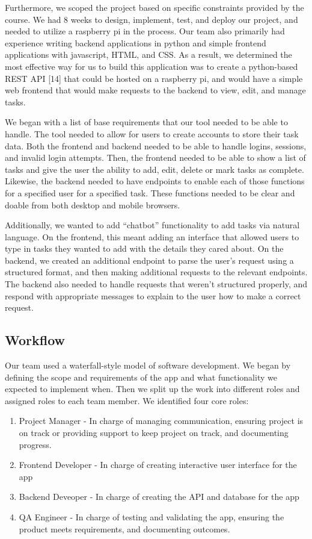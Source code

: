 \documentclass[11pt,oneside]{article}
\begin{document}
Furthermore, we scoped the project based on specific constraints provided by the course. We had 8 weeks to design, implement, test, and deploy our project, and needed to utilize a raspberry pi in the process. Our team also primarily had experience writing backend applications in python and simple frontend applications with javascript, HTML, and CSS. As a result, we determined the most effective way for us to build this application was to create a python-based REST API [14] that could be hosted on a raspberry pi, and would have a simple web frontend that would make requests to the backend to view, edit, and manage tasks.

We began with a list of base requirements that our tool needed to be able to handle. The tool needed to allow for users to create accounts to store their task data. Both the frontend and backend needed to be able to handle logins, sessions, and invalid login attempts. Then, the frontend needed to be able to show a list of tasks and give the user the ability to add, edit, delete or mark tasks as complete. Likewise, the backend needed to have endpoints to enable each of those functions for a specified user for a specified task. These functions needed to be clear and doable from both desktop and mobile browsers.

Additionally, we wanted to add “chatbot” functionality to add tasks via natural language. On the frontend, this meant adding an interface that allowed users to type in tasks they wanted to add with the details they cared about. On the backend, we created an additional endpoint to parse the user’s request using a structured format, and then making additional requests to the relevant endpoints. The backend also needed to handle requests that weren’t structured properly, and respond with appropriate messages to explain to the user how to make a correct request. 

\subsection{Workflow}
Our team used a waterfall-style model of software development. We began by defining the scope and requirements of the app and what functionality we expected to implement when. Then we split up the work into different roles and assigned roles to each team member. We identified four core roles:

\begin{enumerate}
\item Project Manager - In charge of managing communication, ensuring project is on track or providing support to keep project on track, and documenting progress.
\item Frontend Developer - In charge of creating interactive user interface for the app
\item Backend Deveoper - In charge of creating the API and database for the app
\item QA Engineer - In charge of testing and validating the app, ensuring the product meets requirements, and documenting outcomes.
\end{enumerate}
\end{document}
